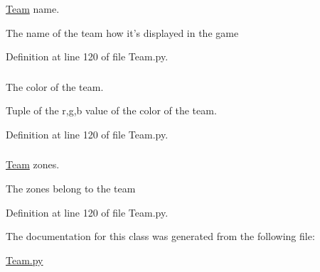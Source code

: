 \hyperlink{class_team_1_1_team}{\-Team} name. 

\-The name of the team how it's displayed in the game 

\-Definition at line 120 of file \-Team.\-py.

\hypertarget{class_team_1_1_team_a15e6e8ac7bbd66106dc357906ee6fcb7}{
\subsubsection[{color}]{}}
\label{class_team_1_1_team_a15e6e8ac7bbd66106dc357906ee6fcb7}


\-The color of the team. 

\-Tuple of the r,g,b value of the color of the team. 

\-Definition at line 120 of file \-Team.\-py.

\hypertarget{class_team_1_1_team_afbbfa95c8949d0da4ab274c8a4d88753}{
\subsubsection[{zones}]{}}
\label{class_team_1_1_team_afbbfa95c8949d0da4ab274c8a4d88753}


\hyperlink{class_team_1_1_team}{\-Team} zones. 

\-The zones belong to the team 

\-Definition at line 120 of file \-Team.\-py.



\-The documentation for this class was generated from the following file\-:\begin{DoxyCompactItemize}
\item 
\hyperlink{_team_8py}{\-Team.\-py}\end{DoxyCompactItemize}
